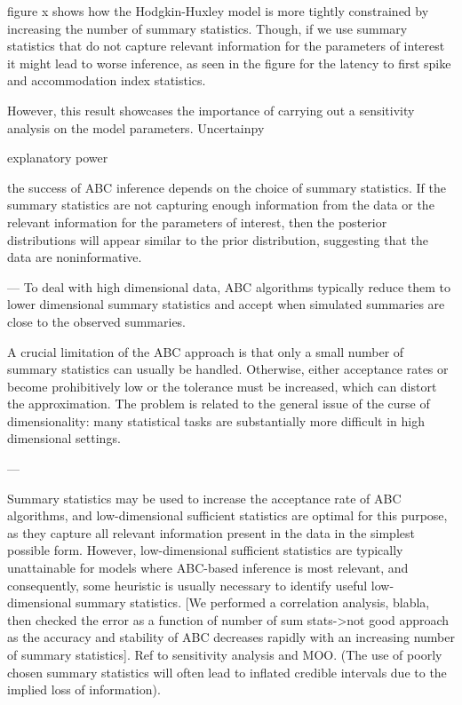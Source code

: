 figure x shows how the Hodgkin-Huxley model is more tightly constrained by increasing the number of summary statistics. Though, if we use summary statistics that do not capture relevant information for the parameters of interest it might lead to worse inference, as seen in the figure for the latency to first spike and accommodation index statistics.  

However, this result showcases the importance of carrying out a sensitivity analysis on the model parameters. Uncertainpy

explanatory power

the success of ABC inference depends on the choice of summary statistics. If the summary statistics are not capturing enough information from the data or the relevant information for the parameters of interest, then the posterior distributions will appear similar to the prior distribution, suggesting that the data are noninformative. 

--- 
To deal with high dimensional data, ABC algorithms typically reduce them to lower dimensional summary statistics and accept when simulated summaries are close to the observed summaries. 

A crucial limitation of the ABC approach is that only a small number of summary statistics can usually be handled. Otherwise, either acceptance rates or become prohibitively low or the tolerance must be increased, which can distort the approximation. The problem is related to the general issue of the curse of dimensionality: many statistical tasks are substantially more difficult in high dimensional settings. 


--- 

Summary statistics may be used to increase the acceptance rate of ABC algorithms, and low-dimensional sufficient statistics are optimal for this purpose, as they capture all relevant information present in the data in the simplest possible form. However, low-dimensional sufficient statistics are typically unattainable for models where ABC-based inference is most relevant, and consequently, some heuristic is usually necessary to identify useful low-dimensional summary statistics. [We performed a correlation analysis, blabla, then checked the error as a function of number of sum stats->not good approach as the accuracy and stability of ABC decreases rapidly with an increasing number of summary statistics]. Ref to sensitivity analysis and MOO. (The use of poorly chosen summary statistics will often lead to inflated credible intervals due to the implied loss of information).

